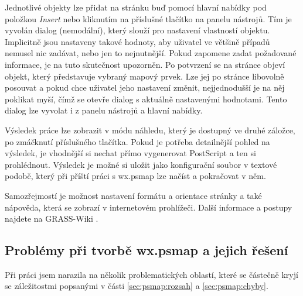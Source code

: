 \documentclass[a4paper,12pt,draft]{article}
\begin{document}
Jednotlivé objekty lze přidat na stránku buď pomocí hlavní nabídky pod položkou \emph{Insert} nebo kliknutím na příslušné tlačítko na panelu nástrojů. Tím je vyvolán dialog (nemodální), který slouží pro nastavení vlastností objektu. Implicitně jsou nastaveny takové hodnoty, aby uživatel ve většině případů nemusel nic zadávat, nebo jen to nejnutnější. Pokud zapomene zadat požadované informace, je na tuto skutečnost upozorněn. Po potvrzení se na stránce objeví objekt, který představuje vybraný mapový prvek. Lze jej po stránce libovolně posouvat a pokud chce uživatel jeho nastavení změnit, nejjednodušší je na něj poklikat myší, čímž se otevře dialog s aktuálně nastavenými hodnotami. Tento dialog lze vyvolat i z panelu nástrojů a hlavní nabídky.

Výsledek práce lze zobrazit v módu náhledu, který je dostupný ve druhé záložce, po zmáčknutí příslušného tlačítka. Pokud je potřeba detailnější pohled na výsledek, je vhodnější si nechat přímo vygenerovat PostScript a ten si prohlédnout. Výsledek je možné si uložit jako konfigurační soubor v textové podobě, který při příští práci s wx.psmap lze načíst a pokračovat v něm. 

Samozřejmostí je možnost nastavení formátu a orientace stránky a také nápověda, která se zobrazí v internetovém prohlížeči. Další informace a postupy najdete na GRASS-Wiki \cite{wiki_wxpsmap}.


\subsection[Problémy při tvorbě wx.psmap]{Problémy při tvorbě wx.psmap a jejich řešení}
\label{sec:gui:problemy}
Při práci jsem narazila na několik problematických oblastí, které se částečně kryjí se záležitostmi popsanými v části \ref{sec:psmap:rozsah} a \ref{sec:psmap:chyby}. 
\end{document}
